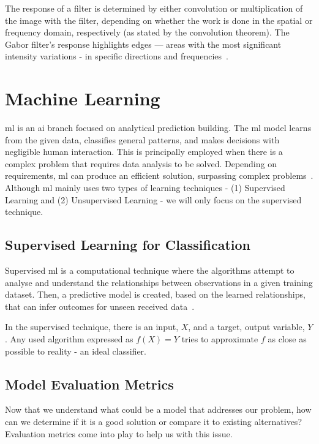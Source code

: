 The response of a filter is determined by either convolution or multiplication of the image with the filter, depending on whether the work is done in the spatial or frequency domain, respectively (as stated by the convolution theorem). The Gabor filter's response highlights edges — areas with the most significant intensity variations - in specific directions and frequencies~\cite{abbasian_ardakani_interpretation_2022}.

\section{Machine Learning}\label{sec:ml}
\acf{ml} is an \acf{ai} branch focused on analytical prediction building.
The \ac{ml} model learns from the given data, classifies general patterns, and makes decisions with negligible human interaction. This is principally employed when there is a complex problem that requires data analysis to be solved. Depending on requirements, \ac{ml} can produce an efficient solution, surpassing complex problems~\cite{naidu_review_2023}.
Although \ac{ml} mainly uses two types of learning techniques - (1) Supervised Learning and (2) Unsupervised Learning -  we will only focus on the supervised technique.

\subsection{Supervised Learning for Classification}

Supervised \ac{ml} is a computational technique where the algorithms attempt to analyse and understand the relationships between observations in a given training dataset. Then, a predictive model is created, based on the learned relationships, that can infer outcomes for unseen received data~\cite{naidu_review_2023}.

In the supervised technique, there is an input, $X$, and a target, output variable, $Y$.
Any used algorithm expressed as $f(X) = Y$ tries to approximate $f$ as close as possible to reality - an ideal classifier.

\subsection{Model Evaluation Metrics}\label{subsec:metrics}

Now that we understand what could be a model that addresses our problem, how can we determine if it is a good solution or compare it to existing alternatives? Evaluation metrics come into play to help us with this issue.

